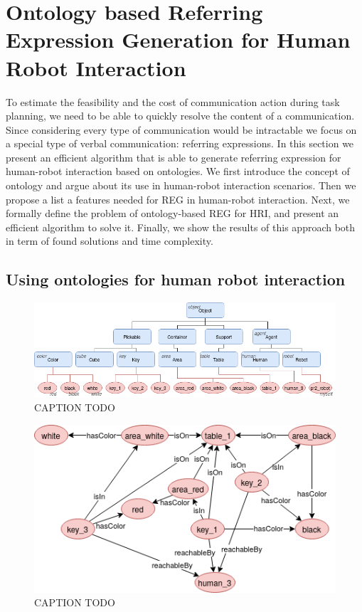 \documentclass[a4paper,11pt,twoside]{StyleThese}
\begin{document}
\section{Ontology based Referring Expression Generation for Human Robot Interaction}
To estimate the feasibility and the cost of communication action during task planning, we need to be able to quickly resolve the content of a communication. Since considering every type of communication would be intractable we focus on a special type of verbal communication: referring expressions.
In this section we present an efficient algorithm that is able to generate referring expression for human-robot interaction based on ontologies. We first introduce the concept of ontology and argue about its use in human-robot interaction scenarios. Then we propose a list a features needed for REG in human-robot interaction. Next, we formally define the problem of ontology-based REG for HRI, and present an efficient algorithm to solve it. Finally, we show the results of this approach both in term of found solutions and time complexity.

\subsection{Using ontologies for human robot interaction}
\begin{figure}[hbtp]
\centering
\includegraphics[width=\textwidth]{figures/chapter3/AboxTbox.png}
\caption{CAPTION TODO}
\label{fig:chap3aboxtbox}
\end{figure}

\begin{figure}[hbtp]
\centering
\includegraphics[width=\textwidth]{figures/chapter3/ABoxR.png}
\caption{CAPTION TODO}
\label{fig:chap3aboxrel}
\end{figure}
\end{document}
